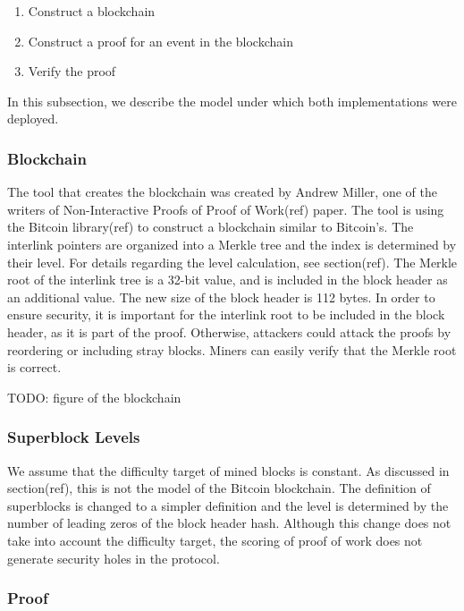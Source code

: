 \begin{enumerate}
    \item
        Construct a blockchain
    \item
        Construct a proof for an event in the blockchain
    \item
        Verify the proof
\end{enumerate}

In this subsection, we describe the model under which both
implementations were deployed.

\subsubsection{Blockchain}

The tool that creates the blockchain was created by Andrew Miller, one
of the writers of Non-Interactive Proofs of Proof of Work(ref) paper.
The tool is using the Bitcoin library(ref) to construct a blockchain
similar to Bitcoin’s. The interlink pointers are organized into a
Merkle tree and the index is determined by their level. For details
regarding the level calculation, see section(ref). The Merkle root of
the interlink tree is a 32-bit value, and is included in the
block header as an additional value. The new size of the block header
is 112 bytes. In order to ensure security, it is important for the
interlink root to be included in the block header, as it is part of
the proof. Otherwise, attackers could attack the proofs by reordering
or including stray blocks. Miners can easily verify that the Merkle
root is correct.

TODO: figure of the blockchain

\subsubsection{Superblock Levels}

We assume that the difficulty target of mined blocks is constant. As
discussed in section(ref), this is not the model of the Bitcoin
blockchain. The definition of superblocks is changed to a simpler
definition and the level is determined by the number of leading zeros
of the block header hash. Although this change does not take into
account the difficulty target, the scoring of proof of work does not
generate security holes in the protocol.

\subsubsection{Proof}


